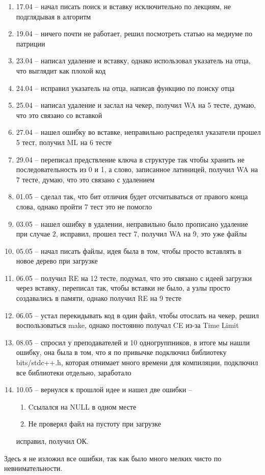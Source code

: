 \documentclass[12pt]{article}
\begin{document}
\begin{enumerate}
    \item 17.04 -- начал писать поиск и вставку исключительно по лекциям, не подглядывая в алгоритм
    \item 19.04 -- ничего почти не работает, решил посмотреть статью на медиуме по патриции
    \item 23.04 -- написал удаление и вставку, однако использовал указатель на отца, что выглядит как плохой код
    \item 24.04 -- исправил указатель на отца, написав функцию по поиску отца
    \item 25.04 -- написал удаление и заслал на чекер, получил WA на 5 тесте, думаю, что это связано со вставкой
    \item 27.04 -- нашел ошибку во вставке, неправильно распределял указатели прошел 5 тест, получил ML на 6 тесте
    \item 29.04 -- переписал предствление ключа в структуре так чтобы хранить не последовательность из 0 и 1, а слово, записанное латиницей, получил WA на 7 тесте, думаю, что это связано с удалением
    \item 01.05 -- сделал так, что бит отличия будет отсчитываться от правого конца слова, однако пройти 7 тест это не помогло
    \item 03.05 -- нашел ошибку в удалении, неправильно было прописано удаление при случае 2, исправил, прошел тест 7, получил WA на 9, это уже файлы
    \item 05.05 -- начал писать файлы, идея была в том, чтобы просто вставлять в новое дерево при загрузке
    \item 06.05 -- получил RE на 12 тесте, подумал, что это связано с идеей загрузки через вставку, переписал так, чтобы вставки не было, а узлы просто создавались в памяти, однако получил RE на 9 тесте
    \item 06.05 -- устал перекидывать код в один файл, чтобы отослать на чекер, решил воспользоваться make, однако постоянно получал CE из-за Time Limit
    \item 08.05 -- спросил у преподавателей и 10 одногруппников, в итоге мы нашли ошибку, она была в том, что я по привычке подключил библиотеку bits/stdc++.h, которая отнимает много времени для компиляции, подключил все библиотеки отдельно, заработало
    \item 10.05 -- вернулся к прошлой идее и нашел две ошибки -- 
    \begin{enumerate}
        \item Cсылался на NULL в одном месте
        \item Не проверял файл на пустоту при загрузке
    \end{enumerate}
        исправил, получил ОК.
\end{enumerate}
Здесь я не изложил все ошибки, так как было много мелких чисто по невнимательности.
\end{document}
